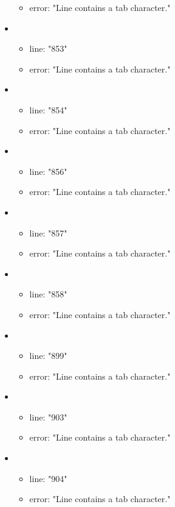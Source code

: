 \begin{itemize}
\begin{itemize}
		\item error: "Line contains a tab character." 
	\end{itemize}
	\item 
	\begin{itemize} 
		\item line: "853" 
		\item error: "Line contains a tab character." 
	\end{itemize}
	\item 
	\begin{itemize} 
		\item line: "854" 
		\item error: "Line contains a tab character." 
	\end{itemize}
	\item 
	\begin{itemize} 
		\item line: "856" 
		\item error: "Line contains a tab character." 
	\end{itemize}
	\item 
	\begin{itemize} 
		\item line: "857" 
		\item error: "Line contains a tab character." 
	\end{itemize}
	\item 
	\begin{itemize} 
		\item line: "858" 
		\item error: "Line contains a tab character." 
	\end{itemize}
	\item 
	\begin{itemize} 
		\item line: "899" 
		\item error: "Line contains a tab character." 
	\end{itemize}
	\item 
	\begin{itemize} 
		\item line: "903" 
		\item error: "Line contains a tab character." 
	\end{itemize}
	\item 
	\begin{itemize} 
		\item line: "904" 
		\item error: "Line contains a tab character." 
	\end{itemize}

\end{itemize}

